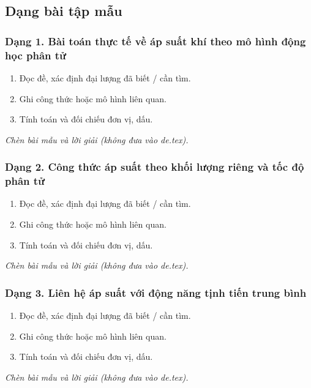 

\subsection{Dạng bài tập mẫu}
\subsubsection{Dạng 1. Bài toán thực tế về áp suất khí theo mô hình động học phân tử}
\begin{phuongphap}
\begin{enumerate}
\item Đọc đề, xác định đại lượng đã biết / cần tìm.
\item Ghi công thức hoặc mô hình liên quan.
\item Tính toán và đối chiếu đơn vị, dấu.
\end{enumerate}
\end{phuongphap}
\begin{vidumau}
\textit{Chèn bài mẫu và lời giải (không đưa vào de.tex).}
\end{vidumau}

\subsubsection{Dạng 2. Công thức áp suất theo khối lượng riêng và tốc độ phân tử}
\begin{phuongphap}
\begin{enumerate}
\item Đọc đề, xác định đại lượng đã biết / cần tìm.
\item Ghi công thức hoặc mô hình liên quan.
\item Tính toán và đối chiếu đơn vị, dấu.
\end{enumerate}
\end{phuongphap}
\begin{vidumau}
\textit{Chèn bài mẫu và lời giải (không đưa vào de.tex).}
\end{vidumau}

\subsubsection{Dạng 3. Liên hệ áp suất với động năng tịnh tiến trung bình}
\begin{phuongphap}
\begin{enumerate}
\item Đọc đề, xác định đại lượng đã biết / cần tìm.
\item Ghi công thức hoặc mô hình liên quan.
\item Tính toán và đối chiếu đơn vị, dấu.
\end{enumerate}
\end{phuongphap}
\begin{vidumau}
\textit{Chèn bài mẫu và lời giải (không đưa vào de.tex).}
\end{vidumau}

